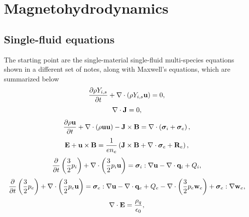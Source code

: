 \documentclass[a4paper,11pt]{report}
\begin{document}
\chapter{Magnetohydrodynamics}
\section{Single-fluid equations}
The starting point are the single-material single-fluid multi-species equations shown in a different set of notes, along with Maxwell's equations, which are summarized below
\begin{equation}
    \label{eq:sf_sm_ms_ni}
    \frac{\partial \rho Y_{i,s}}{\partial t} + \nabla \cdot \left( \rho Y_{i,s} \mathbf{u} \right) = 0,
\end{equation}
\begin{equation}
    \label{eq:sf_sm_ms_ne}
    \nabla \cdot \mathbf{J} = 0,
\end{equation}
\begin{equation}
    \label{eq:sf_sm_ms_ui}
    \frac{\partial \rho \mathbf{u}}{\partial t} + \nabla \cdot \left( \rho \mathbf{u} \mathbf{u} \right) - \mathbf{J} \times \mathbf{B} = \nabla \cdot \left( \bm \sigma_i + \bm \sigma_e \right),
\end{equation}
\begin{equation}
    \label{eq:sf_sm_ms_ue}
    \mathbf{E} + \mathbf{u} \times \mathbf{B} = \frac{1}{e n_e} \left( \mathbf{J} \times \mathbf{B} + \nabla \cdot \bm \sigma_e + \mathbf{R}_e \right) ,
\end{equation}
\begin{equation}
    \label{eq:sf_sm_ms_iei}
    \frac{\partial}{\partial t} \left( \frac{3}{2} p_i \right) + \nabla \cdot \left( \frac{3}{2} p_i \mathbf{u} \right) = \bm \sigma_i : \nabla \mathbf{u} - \nabla \cdot \mathbf{q}_i + Q_i,
\end{equation}
\begin{equation}
    \label{eq:sf_sm_ms_iee}
    \frac{\partial}{\partial t} \left( \frac{3}{2} p_e \right) + \nabla \cdot \left( \frac{3}{2} p_e \mathbf{u} \right) = \bm \sigma_e : \nabla \mathbf{u} - \nabla \cdot \mathbf{q}_e + Q_e - \nabla \cdot \left( \frac{3}{2} p_e \mathbf{w}_e \right) + \bm \sigma_e : \nabla \mathbf{w}_e,
\end{equation}
\begin{equation}
    \label{eq:sf_sm_ms_maxwell_3}
    \nabla \cdot \mathbf{E} = \frac{\rho_q}{\epsilon_0},
\end{equation}
\end{document}
